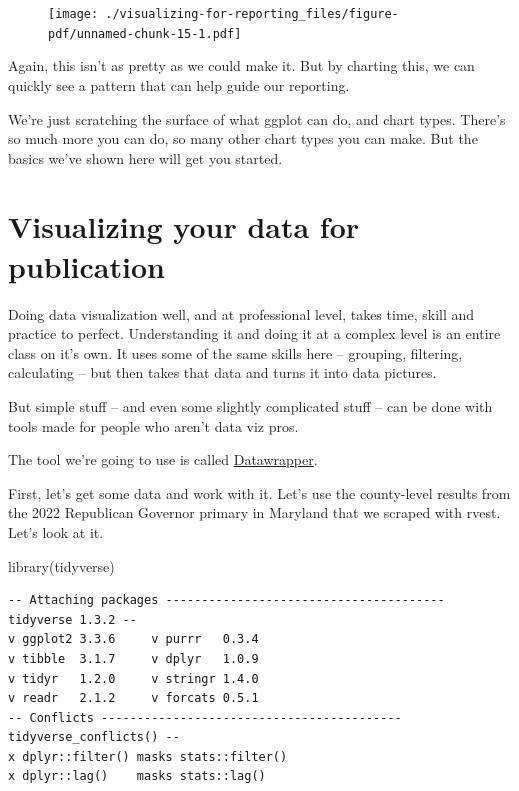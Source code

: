 \documentclass[
  letterpaper,
  DIV=11,
  numbers=noendperiod]{scrreprt}
\newenvironment{Shaded}{\begin{snugshade}}{\end{snugshade}}
\newcommand{\FunctionTok}[1]{\textcolor[rgb]{0.28,0.35,0.67}{#1}}
\newcommand{\NormalTok}[1]{\textcolor[rgb]{0.00,0.23,0.31}{#1}}
\begin{document}
\begin{figure}[H]

{\centering \texttt{[image: ./visualizing-for-reporting\_files/figure-pdf/unnamed-chunk-15-1.pdf]}

}

\end{figure}

Again, this isn't as pretty as we could make it. But by charting this,
we can quickly see a pattern that can help guide our reporting.

We're just scratching the surface of what ggplot can do, and chart
types. There's so much more you can do, so many other chart types you
can make. But the basics we've shown here will get you started.


\hypertarget{visualizing-your-data-for-publication}{%
\chapter{Visualizing your data for
publication}\label{visualizing-your-data-for-publication}}

Doing data visualization well, and at professional level, takes time,
skill and practice to perfect. Understanding it and doing it at a
complex level is an entire class on it's own. It uses some of the same
skills here -- grouping, filtering, calculating -- but then takes that
data and turns it into data pictures.

But simple stuff -- and even some slightly complicated stuff -- can be
done with tools made for people who aren't data viz pros.

The tool we're going to use is called
\href{https://www.datawrapper.de/}{Datawrapper}.

First, let's get some data and work with it. Let's use the county-level
results from the 2022 Republican Governor primary in Maryland that we
scraped with rvest. Let's look at it.

\begin{Shaded}
\begin{Highlighting}[]
\FunctionTok{library}\NormalTok{(tidyverse)}
\end{Highlighting}
\end{Shaded}

\begin{verbatim}
-- Attaching packages --------------------------------------- tidyverse 1.3.2 --
v ggplot2 3.3.6     v purrr   0.3.4
v tibble  3.1.7     v dplyr   1.0.9
v tidyr   1.2.0     v stringr 1.4.0
v readr   2.1.2     v forcats 0.5.1
-- Conflicts ------------------------------------------ tidyverse_conflicts() --
x dplyr::filter() masks stats::filter()
x dplyr::lag()    masks stats::lag()
\end{verbatim}
\end{document}
